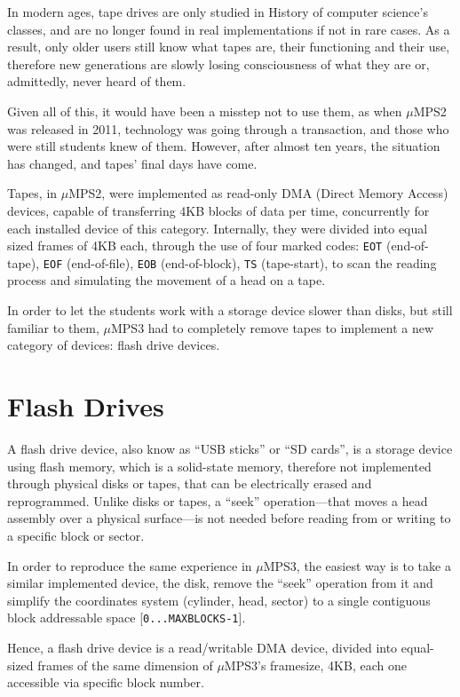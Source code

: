 \documentclass[12pt,a4paper,openright,twoside]{report}
\begin{document}
In modern ages, tape drives are only studied in History of computer science's classes, and are no longer found in real implementations if not in rare cases.
As a result, only older users still know what tapes are, their functioning and their use, therefore new generations are slowly losing consciousness of what they are or, admittedly, never heard of them.

Given all of this, it would have been a misstep not to use them, as when $\mu$MPS2 was released in 2011, technology was going through a transaction, and those who were still students knew of them. However, after almost ten years, the situation has changed, and tapes' final days have come.

Tapes, in $\mu$MPS2, were implemented as read-only DMA (Direct Memory Access) devices, capable of transferring 4KB blocks of data per time, concurrently for each installed device of this category.
Internally, they were divided into equal sized frames of 4KB each, through the use of four marked codes: \texttt{EOT} (end-of-tape), \texttt{EOF} (end-of-file), \texttt{EOB} (end-of-block), \texttt{TS} (tape-start), to scan the reading process and simulating the movement of a head on a tape.

In order to let the students work with a storage device slower than disks, but still familiar to them, $\mu$MPS3 had to completely remove tapes to implement a new category of devices: flash drive devices.

\section{Flash Drives}
A flash drive device, also know as ``USB sticks'' or ``SD cards'', is a storage device using flash memory, which is a solid-state memory, therefore not implemented through physical disks or tapes, that can be electrically erased and reprogrammed.
Unlike disks or tapes, a ``seek'' operation---that moves a head assembly over a physical surface---is not needed before reading from or writing to a specific block or sector.

In order to reproduce the same experience in $\mu$MPS3, the easiest way is to take a similar implemented device, the disk, remove the ``seek'' operation from it and simplify the coordinates system (cylinder, head, sector) to a single contiguous block addressable space [\texttt{0...MAXBLOCKS-1}].

Hence, a flash drive device is a read/writable DMA device, divided into equal-sized frames of the same dimension of $\mu$MPS3's framesize, 4KB, each one accessible via specific block number.
\end{document}
